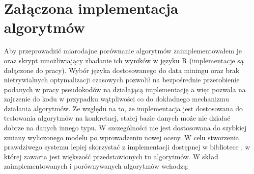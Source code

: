 \documentclass{pracamgr}
\begin{document}
  \section{Załączona implementacja algorytmów}
   Aby przeprowadzić miarodajne porównanie algorytmów zaimplementowałem je oraz skrypt umożliwiający zbadanie ich wyników w języku R
   (implementacje są dołączone do pracy).
   Wybór języka dostosowanego do data miningu oraz brak nietrywialnych optymalizacji czasowych pozwolił na bezpośrednie przerobienie
   podanych w pracy pseudokodów na działającą implementację a więc pozwala na zajrzenie do kodu w przypadku wątpliwości co do dokładnego
   mechanizmu działania algorytmów.
   Ze względu na to, że implementacja jest dostosowana do testowania algorytmów na konkretnej, stałej bazie danych może nie działać dobrze
   na danych innego typu. W szczególności nie jest dostosowana do szybkiej zmiany wyliczonego modelu po wprowadzeniu nowej oceny.
   W celu stworzenia prawdziwego systemu lepiej skorzystać z implementacji dostępnej w bibliotece \cite{MML}, w której zawarta jest
   większość przedstawionych tu algorytmów.\newline
   W skład zaimplementowanych i porównywanych algorytmów wchodzą:
\end{document}

